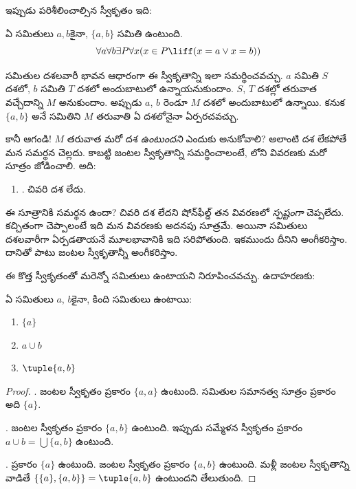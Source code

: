 \documentclass[../../../include/open-logic-section]{subfiles}
\begin{document}

ఇప్పుడు పరిశీలించాల్సిన
స్వీకృతం ఇది:

\begin{axiom}[జంటలు]
ఏ సమితులు $a, b$కైనా,
$\{a, b\}$ సమితి ఉంటుంది.
\[
	\forall a \forall b \exists P \forall x (x \in P \liff (x = a \lor x = b))
\]
\end{axiom}

సమితుల దశలవారీ భావన ఆధారంగా
ఈ స్వీకృతాన్ని ఇలా సమర్థించవచ్చు. $a$ సమితి
$S$ దశలో, $b$ సమితి
$T$ దశలో అందుబాటులో
ఉన్నాయనుకుందాం. $S$,
$T$ దశల్లో తరువాత
వచ్చేదాన్ని $M$ అనుకుందాం.
అప్పుడు $a$, $b$ రెండూ
$M$ దశలో అందుబాటులో
ఉన్నాయి. కనుక $\{a,b\}$
అనే సమితిని $M$ తరువాతి
ఏ దశలోనైనా ఏర్పరచవచ్చు.

కానీ ఆగండి!{} $M$ తరువాత
మరో దశ \emph{ఉంటుందని}
ఎందుకు అనుకోవాలి? అలాంటి దశ లేకపోతే
మన సమర్థన చెల్లదు. కాబట్టి
జంటల స్వీకృతాన్ని
సమర్థించాలంటే,
లోని
వివరణకు మరో సూత్రం జోడించాలి. అది:
\begin{enumerate}
	\item[] \stagessucc. చివరి దశ లేదు.
\end{enumerate}
ఈ సూత్రానికి సమర్థన ఉందా?
చివరి దశ లేదని
షోన్‌ఫీల్డ్ తన వివరణలో \emph{స్పష్టంగా} చెప్పలేదు. కచ్చితంగా
చెప్పాలంటే ఇది మన వివరణకు అదనపు సూత్రమే. అయినా సమితులు
దశలవారీగా ఏర్పడతాయనే మూలభావానికి ఇది సరిపోతుంది.
ఇకముందు దీనిని అంగీకరిస్తాం.
దానితో పాటు జంటల
స్వీకృతాన్నీ అంగీకరిస్తాం.

ఈ కొత్త స్వీకృతంతో
మరెన్నో సమితులు
ఉంటాయని నిరూపించవచ్చు.
ఉదాహరణకు:

\begin{prop}
ఏ సమితులు $a$, $b$కైనా,
కింది సమితులు ఉంటాయి:
	\begin{enumerate}
		\item{} $\{a\}$
		\item{} $a \cup b$
		\item{} $\tuple{a, b}$
	\end{enumerate}
\end{prop}

\begin{proof}
. జంటల స్వీకృతం
ప్రకారం $\{a, a\}$ ఉంటుంది.
సమితుల సమానత్వ సూత్రం
ప్రకారం అది $\{a\}$.

. జంటల
స్వీకృతం ప్రకారం
$\{a, b\}$ ఉంటుంది.
ఇప్పుడు సమ్మేళన స్వీకృతం
ప్రకారం $a \cup b = \bigcup
\{a, b\}$ ఉంటుంది.

. 
ప్రకారం $\{a\}$ ఉంటుంది.
జంటల స్వీకృతం ప్రకారం
$\{a,
b\}$ ఉంటుంది. మళ్లీ
జంటల స్వీకృతాన్ని వాడితే
$\{\{a\}, \{a, b\}\} = \tuple{a, b}$
ఉంటుందని తేలుతుంది.
\end{proof}
\end{document}
